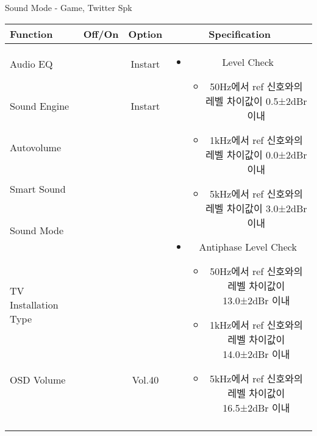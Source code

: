 \begin{frame}[t]{Sound Mode - Game, Twitter Spk}
\begin{tiny}
\begin{tabular}{@{}lccc@{}}
\toprule
Function & Off/On & Option & Specification \\
\midrule
Audio EQ & \color{black}{Off} & Instart &
\multirow{10}{60mm}{
\begin{itemize}
    \item Level Check
    \begin{itemize}
        \item 50Hz에서 ref 신호와의 레벨 차이값이 0.5±2dBr 이내
        \item 1kHz에서 ref 신호와의 레벨 차이값이 0.0±2dBr 이내
        \item 5kHz에서 ref 신호와의 레벨 차이값이 3.0±2dBr 이내
    \end{itemize}
    \item Antiphase Level Check
    \begin{itemize}
        \item 50Hz에서 ref 신호와의 레벨 차이값이 13.0±2dBr 이내
        \item 1kHz에서 ref 신호와의 레벨 차이값이 14.0±2dBr 이내
        \item 5kHz에서 ref 신호와의 레벨 차이값이 16.5±2dBr 이내
    \end{itemize}
\end{itemize}
} \\
Sound Engine & \color{blue}{On} & Instart & \\
Autovolume & \color{black}{Off} & & \\
Smart Sound & \color{black}{Off} & & \\
Sound Mode & \color{blue}{On} & \color{blue}{Game} & \\
TV Installation Type & \color{blue}{On} & \color{black}{Standtype1} & \\
OSD Volume & \color{blue}{On} & Vol.40 & \\
& & & \\
& & & \\
& & & \\
& & & \\
\midrule
\end{tabular}
\end{tiny}

\end{frame}
